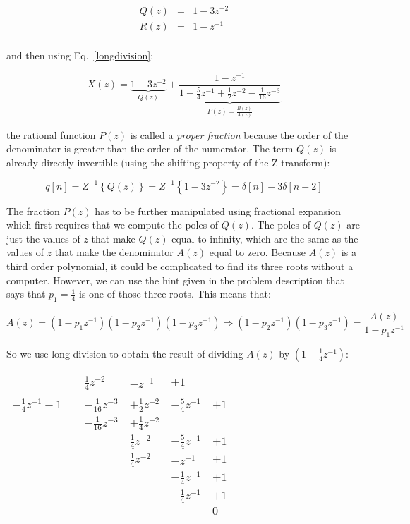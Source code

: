 \documentclass[a4paper,11pt,oneside]{article}
\begin{document}
\[
\begin{array}{lll}
Q(z)&=&1-3z^{-2}\\
R(z)&=&1-z^{-1}\\
\end{array}
\]

and then using Eq.~\ref{longdivision}:

\begin{equation}\label{eq2}
X(z)=\underbrace{1-3z^{-2}}_{Q(z)}+\underbrace{\frac{1-z^{-1}}{1-\frac{5}{4}z^{-1}+\frac{1}{2}z^{-2}-\frac{1}{16}z^{-3}}}_{P(z)=\frac{B(z)}{A(z)}}
\end{equation}

the rational function $P(z)$ is called a \emph{proper fraction} because the order of the denominator is greater than the order of the numerator. The term $Q(z)$ is already directly invertible (using the shifting property of the Z-transform):

\[
q[n]=Z^{-1}\left\{Q(z)\right\}=Z^{-1}\left\{1-3z^{-2}\right\}=\delta[n]-3\delta[n-2]
\]

The fraction $P(z)$ has to be further manipulated using fractional expansion which first requires that we compute the poles of $Q(z)$. The poles of $Q(z)$ are just the values of $z$ that make $Q(z)$ equal to infinity, which are the same as the values of $z$ that make the denominator $A(z)$ equal to zero. Because $A(z)$ is a third order polynomial, it could be complicated to find its three roots without a computer. However, we can use the hint given in the problem description that says that $p_1=\frac{1}{4}$ is one of those three roots. This means that:

\[
A(z)=(1-p_{1}z^{-1})(1-p_{2}z^{-1})(1-p_{3}z^{-1})\Rightarrow (1-p_{2}z^{-1})(1-p_{3}z^{-1})=\frac{A(z)}{1-p_1z^{-1}}
\]

So we use long division to obtain the result of dividing $A(z)$ by $(1-\frac{1}{4}z^{-1})$:

\begin{tabular}{r|cllllll}
&\qquad&$\frac{1}{4}z^{-2}$&$-z^{-1}$&$+1$&&&\\
\cline{2-8}
\\
$-\frac{1}{4}z^{-1}+1$&&$-\frac{1}{16}z^{-3}$&$+\frac{1}{2}z^{-2}$&$-\frac{5}{4}z^{-1}$&$+1$&&\\
&&$-\frac{1}{16}z^{-3}$&$+\frac{1}{4}z^{-2}$&&&&\\
\cline{3-8}
&&&$\frac{1}{4}z^{-2}$&$-\frac{5}{4}z^{-1}$&$+1$&&\\
&&&$\frac{1}{4}z^{-2}$&$-z^{-1}$&$+1$&&\\
\cline{4-8}
&&&&$-\frac{1}{4}z^{-1}$&$+1$&&\\
&&&&$-\frac{1}{4}z^{-1}$&$+1$&&\\
\cline{5-8}
&&&&&$0$&&\\
\end{tabular}
\end{document}
